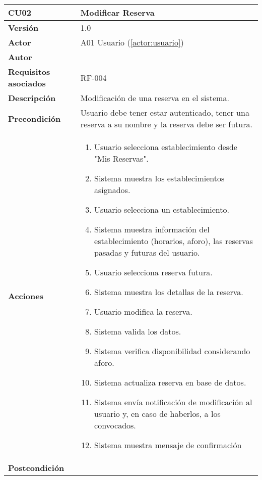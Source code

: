 \begin{table}[H]
	\centering
	\begin{tabularx}{\linewidth}{ p{} p{} }
		\toprule
		\textbf{CU02}    & \textbf{Modificar Reserva} \\
		\toprule
		\textbf{Versión}              & 1.0    \\
		\textbf{Actor}                & A01 Usuario (\ref{actor:usuario}) \\
		\textbf{Autor}                & \nombre \\
		\textbf{Requisitos asociados} & RF-004 \\
		\textbf{Descripción}          & Modificación de una reserva en el sistema. \\
		\textbf{Precondición}         & Usuario debe tener estar autenticado, tener una reserva a su nombre y la reserva debe ser futura. \\
		\textbf{Acciones}             &
		\begin{enumerate}
			\def\labelenumi{\arabic{enumi}.}
			\tightlist
			\item Usuario selecciona establecimiento desde "Mis Reservas".
            \item Sistema muestra los establecimientos asignados.
            \item Usuario selecciona un establecimiento.
            \item Sistema muestra información del establecimiento (horarios, aforo), las reservas pasadas y futuras del usuario.
            \item Usuario selecciona reserva futura.
            \item Sistema muestra los detallas de la reserva.
            \item Usuario modifica la reserva.
            \item Sistema valida los datos.
            \item Sistema verifica disponibilidad considerando aforo.
            \item Sistema actualiza reserva en base de datos.
            \item Sistema envía notificación de modificación al usuario y, en caso de haberlos, a los convocados.
            \item Sistema muestra mensaje de confirmación
		\end{enumerate}\\
		\textbf{Postcondición}        &
   		\begin{itemize}

\end{itemize}
\end{tabularx}
\end{table}
